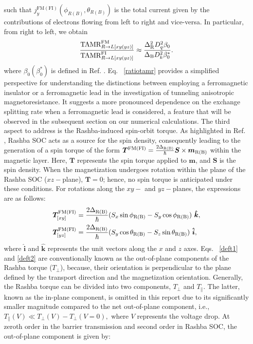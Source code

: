 \documentclass[10pt,pr,twocolumn,showpacs,amssymb,floatfix,superscriptaddress]{revtex4-1}
\newcommand{\tx}{\text}
\newcommand{\para}{\parallel}
\newcommand{\raw}{\rightarrow}
\newcommand{\Dlt}{\Delta}
\newcommand{\h}{\hat}
\begin{document}
such that $ j_y^{\tx{FM}  (\tx{FI})}(\phi_{R (B)},\theta_{R(B)})$ is the total current given by the contributions of electrons flowing from left to right and vice-versa. In particular, from right to left, we obtain
\begin{align}
\frac{\tx{TAMR}_{R \raw L[xy(yz)]}^{\tx{FM}} }{ \tx{TAMR}_{R \raw L[xy(yz)]}^{\tx{FI}}} \approx \frac{ \Dlt_{\rm R}^2 D_q^2 \beta_0 }{ \Dlt_{\rm B} D_k^2 \beta_0^*}.
\label{ratiotamr}
\end{align}
where $\beta_0 (\beta_0^*)$ is defined in Ref. . Eq.~ \eqref{ratiotamr} provides a simplified perspective for understanding the distinctions between employing a ferromagnetic insulator or a ferromagnetic lead in the investigation of tunneling anisotropic magnetoresistance. It suggests a more pronounced dependence on the exchange splitting rate when a ferromagnetic lead is considered, a feature that will be observed in the subsequent section on our numerical calculations. The third aspect to address is the Rashba-induced spin-orbit torque. As highlighted in Ref. , Rashba SOC acts as a source for the spin density, consequently leading to the generation of a spin torque of the form $\bm T^{\text{FM} (\text{FI})} = \frac{2\Delta_{\rm R (B)}}{\hbar} \bm S \times \bm m_{\rm R (B)}$ within the magnetic layer. Here, $\bm T$ represents the spin torque applied to $\bm m$, and $\bm S$ is the spin density.
When the magnetization undergoes rotation within the plane of the Rashba SOC ($xz-$plane), $\bm T = 0$; hence, no spin torque is anticipated under these conditions. For rotations along the $xy-$ and $yz-$planes, the expressions are as follows:
\begin{align}
\label{deft1}
\bm T_{[xy]}^{\tx{FM}(\tx{FI})} &=   \frac{2\Dlt_{\rm R (B)}}{\hbar} (S_x \sin \phi_{\rm R(B)} - S_y \cos \phi_{\rm R(B)}) ~\bm{\h k}, \\
\bm T_{[yz]}^{\tx{FM}(\tx{FI})} &=  \frac{2\Dlt_{\rm R (B)}}{\hbar} (S_y \cos \theta_{\rm R(B)} - S_z \sin \theta_{\rm R(B)}) ~\bm{\h i},
\label{deft2}
\end{align}
where $\bm{\h i}$ and $\bm{\h k}$ represents the unit vectors along the $x$ and $z$ axes. Eqs.~ \eqref{deft1} and \eqref{deft2} are conventionally known as the out-of-plane components of the Rashba torque ($T_\perp$), because, their orientation is perpendicular to the plane defined by the transport direction and the magnetization orientation. Generally, the Rashba torque can be divided into two components, $T_\perp$ and $T_\parallel$. The latter, known as the in-plane component, is omitted in this report due to its significantly smaller magnitude compared to the net out-of-plane component, i.e., $T_\parallel(V) \ll T_{\perp}(V) - T_{\perp} (V=0),$ where $V$ represents the voltage drop. At zeroth order in the barrier transmission and second order in Rashba SOC, the out-of-plane component is given by:
\end{document}
